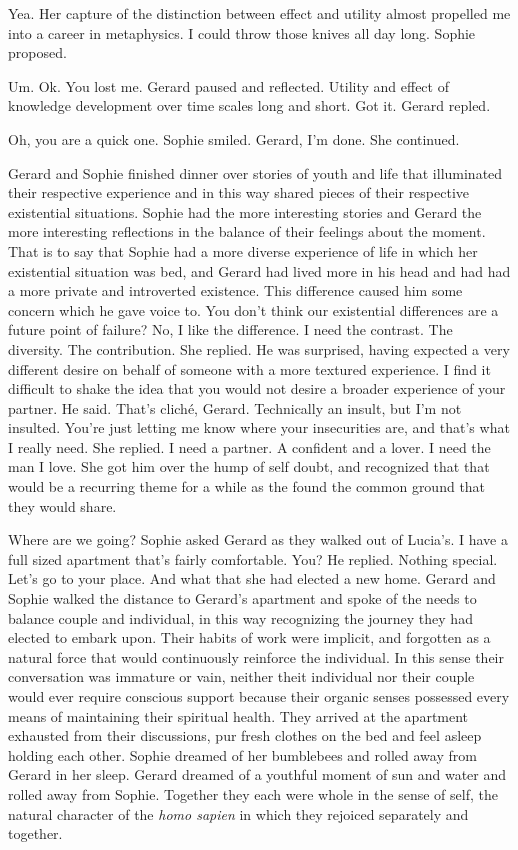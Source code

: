 Yea.  Her capture of the distinction between effect and utility almost
propelled me into a career in metaphysics.  I could throw those knives
all day long.  Sophie proposed.

Um.  Ok.  You lost me.  Gerard paused and reflected.  Utility and
effect of knowledge development over time scales long and short.  Got
it.  Gerard repled.

Oh, you are a quick one.  Sophie smiled.  Gerard, I'm done.  She
continued.



Gerard and Sophie finished dinner over stories of youth and life that
illuminated their respective experience and in this way shared pieces
of their respective existential situations.  Sophie had the more
interesting stories and Gerard the more interesting reflections in the
balance of their feelings about the moment.  That is to say that
Sophie had a more diverse experience of life in which her existential
situation was bed, and Gerard had lived more in his head and had had a
more private and introverted existence.  This difference caused him
some concern which he gave voice to.  You don't think our existential
differences are a future point of failure?  No, I like the difference.
I need the contrast.  The diversity.  The contribution.  She replied.
He was surprised, having expected a very different desire on behalf of
someone with a more textured experience.  I find it difficult to shake
the idea that you would not desire a broader experience of your
partner.  He said.  That's clich\'e, Gerard.  Technically an insult,
but I'm not insulted.  You're just letting me know where your
insecurities are, and that's what I really need.  She replied.  I need
a partner.  A confident and a lover.  I need the man I love.  She got
him over the hump of self doubt, and recognized that that would be a
recurring theme for a while as the found the common ground that they
would share.

Where are we going?  Sophie asked Gerard as they walked out of
Lucia's.  I have a full sized apartment that's fairly comfortable.
You?  He replied.  Nothing special.  Let's go to your place.  And what
that she had elected a new home.  Gerard and Sophie walked the
distance to Gerard's apartment and spoke of the needs to balance
couple and individual, in this way recognizing the journey they had
elected to embark upon.  Their habits of work were implicit, and
forgotten as a natural force that would continuously reinforce the
individual.  In this sense their conversation was immature or vain,
neither theit individual nor their couple would ever require conscious
support because their organic senses possessed every means of
maintaining their spiritual health.  They arrived at the apartment
exhausted from their discussions, pur fresh clothes on the bed and
feel asleep holding each other.  Sophie dreamed of her bumblebees and
rolled away from Gerard in her sleep.  Gerard dreamed of a youthful
moment of sun and water and rolled away from Sophie.  Together they
each were whole in the sense of self, the natural character of the
{\it homo sapien} in which they rejoiced separately and together.

